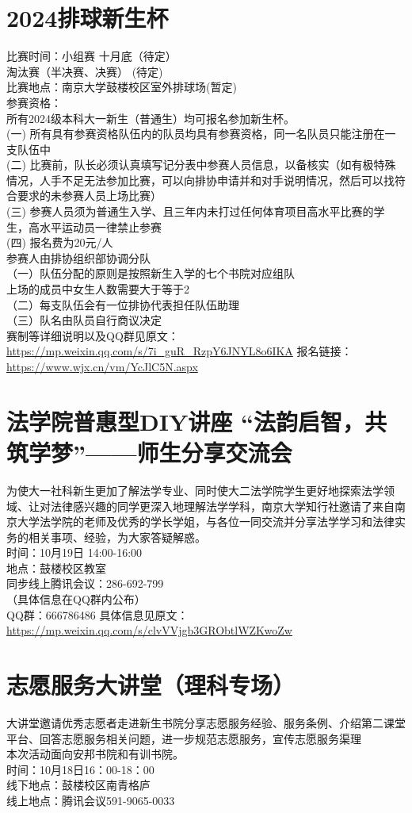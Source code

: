 \documentclass[letterpaper, 12pt]{article}
\begin{document}
\begin{multicols}{2}
\section{2024排球新生杯}
比赛时间：小组赛 十月底（待定）\\
淘汰赛（半决赛、决赛） (待定)\\
比赛地点：南京大学鼓楼校区室外排球场(暂定)\\
参赛资格：\\
所有2024级本科⼤⼀新⽣（普通⽣）均可报名参加新⽣杯。\\
(一) 所有具有参赛资格队伍内的队员均具有参赛资格，同⼀名队员只能注册在⼀⽀队伍中\\
(二) ⽐赛前，队⻓必须认真填写记分表中参赛⼈员信息，以备核实（如有极特殊情况，⼈⼿不⾜⽆法参加⽐赛，可以向排协申请并和对⼿说明情况，然后可以找符合要求的未参赛⼈员上场⽐赛）\\
(三) 参赛⼈员须为普通⽣⼊学、且三年内未打过任何体育项⽬⾼⽔平⽐赛的学⽣，⾼⽔平运动员⼀律禁⽌参赛\\
(四) 报名费为20元/人\\
参赛人由排协组织部协调分队\\
（一）队伍分配的原则是按照新生入学的七个书院对应组队\\
上场的成员中女生人数需要大于等于2\\
（二）每支队伍会有一位排协代表担任队伍助理\\
（三）队名由队员自行商议决定\\
赛制等详细说明以及QQ群见原文：\url{https://mp.weixin.qq.com/s/7i_guR_RzpY6JNYL8o6IKA}
报名链接：\url{https://www.wjx.cn/vm/YcJlC5N.aspx}

\section{法学院普惠型DIY讲座 “法韵启智，共筑学梦”——师生分享交流会}
为使大一社科新生更加了解法学专业、同时使大二法学院学生更好地探索法学领域、让对法律感兴趣的同学更深入地理解法学学科，南京大学知行社邀请了来自南京大学法学院的老师及优秀的学长学姐，与各位一同交流并分享法学学习和法律实务的相关事项、经验，为大家答疑解惑。\\
时间：10月19日 14:00-16:00\\
地点：鼓楼校区教室\\
同步线上腾讯会议：286-692-799\\
（具体信息在QQ群内公布） \\
QQ群：666786486
具体信息见原文：\url{https://mp.weixin.qq.com/s/clvVVjgb3GRObtlWZKwoZw}

\section{志愿服务大讲堂（理科专场）}
大讲堂邀请优秀志愿者走进新生书院分享志愿服务经验、服务条例、介绍第二课堂平台、回答志愿服务相关问题，进一步规范志愿服务，宣传志愿服务渠理\\
本次活动面向安邦书院和有训书院。\\
时间：10月18日16：00-18：00\\
线下地点：鼓楼校区南青格庐\\
线上地点：腾讯会议591-9065-0033\\
\end{multicols}
\end{document}
